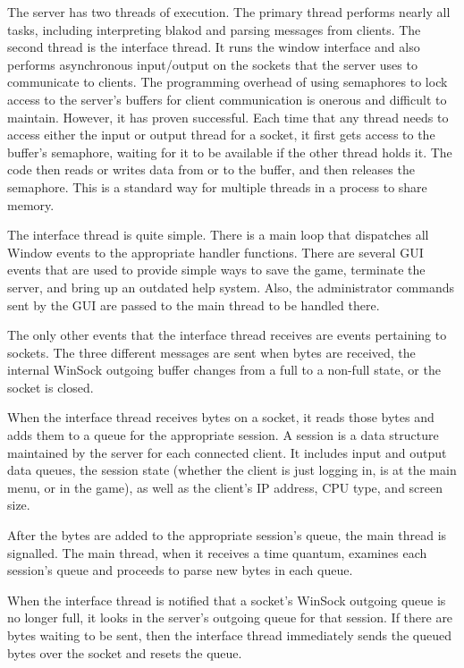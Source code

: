 The server has two threads of execution.  The primary thread performs
nearly all tasks, including interpreting blakod and parsing messages
from clients.  The second thread is the interface thread.  It runs the
window interface and also performs asynchronous input/output on the
sockets that the server uses to communicate to clients.  The
programming overhead of using semaphores to lock access to the
server's buffers for client communication is onerous and difficult to
maintain.  However, it has proven successful.  Each time that any
thread needs to access either the input or output thread for a socket,
it first gets access to the buffer's semaphore, waiting for it
to be available if the other thread holds it.  The code then
reads or writes data from or to the buffer, and then releases the semaphore.
This is a standard way for multiple threads in a process to share
memory.

The interface thread is quite simple.  There is a main loop that
dispatches all Window events to the appropriate handler functions.
There are several GUI events that are used to provide simple ways to
save the game, terminate the server, and bring up an outdated help
system.  Also, the administrator commands sent by the GUI are passed
to the main thread to be handled there.

The only other events that the interface thread receives are events
pertaining to sockets.  The three different messages are sent when
bytes are received, the internal WinSock outgoing buffer changes from
a full to a non-full state, or the socket is closed.

When the interface thread receives bytes on a socket, it reads those
bytes and adds them to a queue for the appropriate session.  A session
is a data structure maintained by the server for each connected
client.  It includes input and output data queues, the session state
(whether the client is just logging in, is at the main menu, or in the
game), as well as the client's IP address, CPU type, and screen size.

After the bytes are added to the appropriate session's queue, the main
thread is signalled.  The main thread, when it receives a time
quantum, examines each session's queue and proceeds to parse new bytes
in each queue.

When the interface thread is notified that a socket's WinSock outgoing
queue is no longer full, it looks in the server's outgoing queue for
that session.  If there are bytes waiting to be sent, then the
interface thread immediately sends the queued bytes over the socket
and resets the queue.

